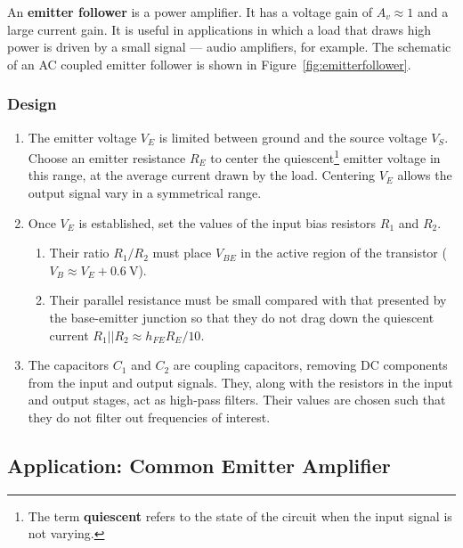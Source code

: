 \documentclass[11pt]{article}
\begin{document}
An \textbf{emitter follower} is a power amplifier. It has a
voltage gain of $A_v \approx 1$ and a large current gain. It is useful
in applications in which a load that draws high power is driven by a
small signal --- audio amplifiers, for example.
The schematic of an AC coupled emitter follower is shown in
Figure~\ref{fig:emitterfollower}. 

\subsubsection*{Design}

\begin{enumerate}
\item The emitter voltage $V_E$ is limited between ground and the
  source voltage $V_S$. Choose an emitter resistance $R_E$ to center
  the quiescent\footnote{The term \textbf{quiescent} refers to the
    state of the circuit when the input signal is not varying.}
  emitter voltage in this range, at the average current
  drawn by the load. Centering $V_E$ allows the output signal vary in
  a symmetrical range.

\item Once $V_E$ is established, set the values of the input bias
  resistors $R_1$ and $R_2$.
  \begin{enumerate}
  \item Their ratio $R_1/R_2$ must place $V_{BE}$ in the active region
    of the transistor ($V_B \approx V_E + 0.6~\mathrm{V}$).

  \item Their parallel resistance must be small compared with that
    presented by the base-emitter junction so that they do not drag 
    down the quiescent current $R_1 || R_2 \approx h_{FE} R_E/ 10$. 
  \end{enumerate}

\item The capacitors $C_1$ and $C_2$ are coupling capacitors, removing
  DC components from the input and output signals. They, along with
  the resistors in the input and output stages, act as high-pass
  filters. Their values are chosen such that they do not filter out
  frequencies of interest.
\end{enumerate}

\subsection{Application: Common Emitter Amplifier}
\label{sec:commonemitter}
\end{document}
